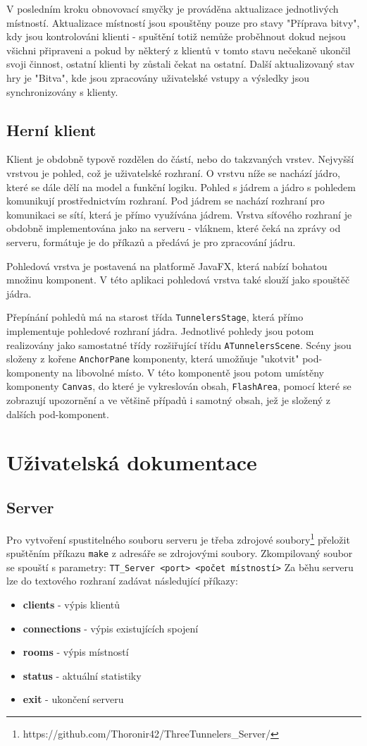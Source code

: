 \documentclass[12pt,a4paper]{article}
\let\oldsection\section
\renewcommand\section{\clearpage\oldsection}
\begin{document}
V posledním kroku obnovovací smyčky je prováděna aktualizace jednotlivých místností. Aktualizace místností jsou spouštěny pouze pro stavy "Příprava bitvy", kdy jsou kontrolováni klienti - spuštění totiž nemůže proběhnout dokud nejsou všichni připraveni a pokud by některý z klientů v tomto stavu nečekaně ukončil svoji činnost, ostatní klienti by zůstali čekat na ostatní. Další aktualizovaný stav hry je "Bitva", kde jsou zpracovány uživatelské vstupy a výsledky jsou synchronizovány s klienty.

\subsection{Herní klient}
Klient je obdobně typově rozdělen do částí, nebo do takzvaných vrstev.
Nejvyšší vrstvou je pohled, což je uživatelské rozhraní. O vrstvu níže se nachází jádro, které se dále dělí na model a funkční logiku. Pohled s jádrem a jádro s pohledem komunikují prostřednictvím rozhraní. Pod jádrem se nachází rozhraní pro komunikaci se sítí, která je přímo využívána jádrem. Vrstva síťového rozhraní je obdobně implementována jako na serveru - vláknem, které čeká na zprávy od serveru, formátuje je do příkazů a předává je pro zpracování jádru.

Pohledová vrstva je postavená na platformě JavaFX, která nabízí bohatou množinu komponent. V této aplikaci pohledová vrstva také slouží jako spouštěč jádra.

Přepínání pohledů má na starost třída \texttt{TunnelersStage}, která přímo implementuje pohledové rozhraní jádra. Jednotlivé pohledy jsou potom realizovány jako samostatné třídy rozšiřující třídu \texttt{ATunnelersScene}. Scény jsou složeny z kořene \texttt{AnchorPane} komponenty, která umožňuje "ukotvit" pod-komponenty na libovolné místo. V této komponentě jsou potom umístěny komponenty \texttt{Canvas}, do které je vykreslován obsah, \texttt{FlashArea}, pomocí které se zobrazují upozornění a ve většině případů i samotný obsah, jež je složený z dalších pod-komponent.

\section{Uživatelská dokumentace}
\subsection{Server}
Pro vytvoření spustitelného souboru serveru je třeba zdrojové soubory\footnote{https://github.com/Thoronir42/ThreeTunnelers\_Server/} přeložit spuštěním příkazu \texttt{make} z adresáře se zdrojovými soubory.
Zkompilovaný soubor se spouští s parametry:
\texttt{TT\_Server <port> <počet místností>}
Za běhu serveru lze do textového rozhraní zadávat následující příkazy:
\begin{itemize}
\item \textbf{clients} - výpis klientů
\item \textbf{connections} - výpis existujících spojení
\item \textbf{rooms} - výpis místností
\item \textbf{status} - aktuální statistiky
\item \textbf{exit} - ukončení serveru
\end{itemize}
\end{document}
